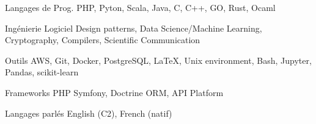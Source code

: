 


\begin{cvskills}
	
	
	\cvskill
	{Langages de Prog.} %
	{PHP, Pyton, Scala, Java, C, C++, GO, Rust, Ocaml} %
	

	\cvskill
	{Ingénierie Logiciel} %
	{Design patterns, Data Science/Machine Learning, Cryptography, Compilers, Scientific Communication} %

	
	\cvskill
	{Outils} %
	{AWS, Git, Docker, PostgreSQL, \LaTeX, Unix environment, Bash, Jupyter, Pandas, scikit-learn} %
	
	
	\cvskill
	{Frameworks} %
	{PHP Symfony, Doctrine ORM, API Platform} %
	
	
	\cvskill
	{Langages parlés} %
	{English (C2), French (natif)} %
	
	
\end{cvskills}